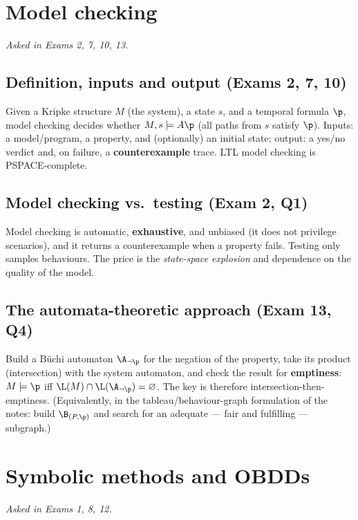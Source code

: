\documentclass[oneside]{academica}
\begin{document}
\section{Model checking}
\emph{Asked in Exams 2, 7, 10, 13.}

\subsection{Definition, inputs and output (Exams 2, 7, 10)}
Given a Kripke structure $M$ (the system), a state $s$, and a temporal
formula $\p$, model checking decides whether $M,s\models A\p$ (all paths
from $s$ satisfy $\p$). Inputs: a model/program, a property, and
(optionally) an initial state; output: a yes/no verdict and, on failure,
a \textbf{counterexample} trace. LTL model checking is PSPACE-complete.

\subsection{Model checking vs.\ testing (Exam 2, Q1)}
Model checking is automatic, \textbf{exhaustive}, and unbiased (it does
not privilege  scenarios), and it returns a counterexample
when a property fails. Testing only samples behaviours. The price is the
\emph{state-space explosion} and dependence on the quality of the model.

\subsection{The automata-theoretic approach (Exam 13, Q4)}
Build a Büchi automaton $\A_{\neg\p}$ for the negation of the property,
take its product (intersection) with the system automaton, and check the
result for \textbf{emptiness}: $M\models\p$ iff $\L(M)\cap\L(\A_{\neg\p})
=\emptyset$. The key  is therefore
intersection-then-emptiness. (Equivalently, in the tableau/behaviour-graph
formulation of the notes: build $\B_{(P,\p)}$ and search for an adequate
--- fair and fulfilling --- subgraph.)

\section{Symbolic methods and OBDDs}
\emph{Asked in Exams 1, 8, 12.}
\end{document}
